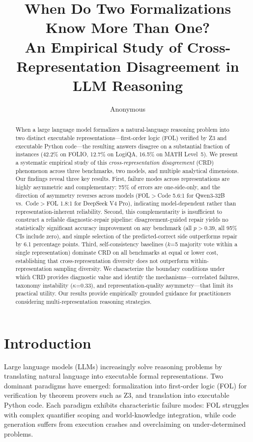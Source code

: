 \documentclass[11pt]{article}
\title{When Do Two Formalizations Know More Than One? \\ An Empirical Study of Cross-Representation Disagreement in LLM Reasoning}
\author{Anonymous}
\date{}
\begin{document}
\maketitle

\begin{abstract}
When a large language model formalizes a natural-language reasoning problem into two distinct executable representations---first-order logic (FOL) verified by Z3 and executable Python code---the resulting answers disagree on a substantial fraction of instances (42.2\% on FOLIO, 12.7\% on LogiQA, 16.5\% on MATH Level~5). We present a systematic empirical study of this \emph{cross-representation disagreement} (CRD) phenomenon across three benchmarks, two models, and multiple analytical dimensions. Our findings reveal three key results. First, failure modes across representations are highly asymmetric and complementary: 75\% of errors are one-side-only, and the direction of asymmetry reverses across models (FOL$>$Code 5.6:1 for Qwen3-32B vs.\ Code$>$FOL 1.8:1 for DeepSeek V4 Pro), indicating model-dependent rather than representation-inherent reliability. Second, this complementarity is insufficient to construct a reliable diagnostic-repair pipeline: disagreement-guided repair yields no statistically significant accuracy improvement on any benchmark (all $p > 0.39$, all 95\% CIs include zero), and simple selection of the predicted-correct side outperforms repair by 6.1 percentage points. Third, self-consistency baselines ($k$=5 majority vote within a single representation) dominate CRD on all benchmarks at equal or lower cost, establishing that cross-representation diversity does not outperform within-representation sampling diversity. We characterize the boundary conditions under which CRD provides diagnostic value and identify the mechanisms---correlated failures, taxonomy instability ($\kappa$=0.33), and representation-quality asymmetry---that limit its practical utility. Our results provide empirically grounded guidance for practitioners considering multi-representation reasoning strategies.
\end{abstract}

\section{Introduction}

Large language models (LLMs) increasingly solve reasoning problems by translating natural language into executable formal representations. Two dominant paradigms have emerged: formalization into first-order logic (FOL) for verification by theorem provers such as Z3, and translation into executable Python code. Each paradigm exhibits characteristic failure modes: FOL struggles with complex quantifier scoping and world-knowledge integration, while code generation suffers from execution crashes and overclaiming on under-determined problems.
\end{document}
